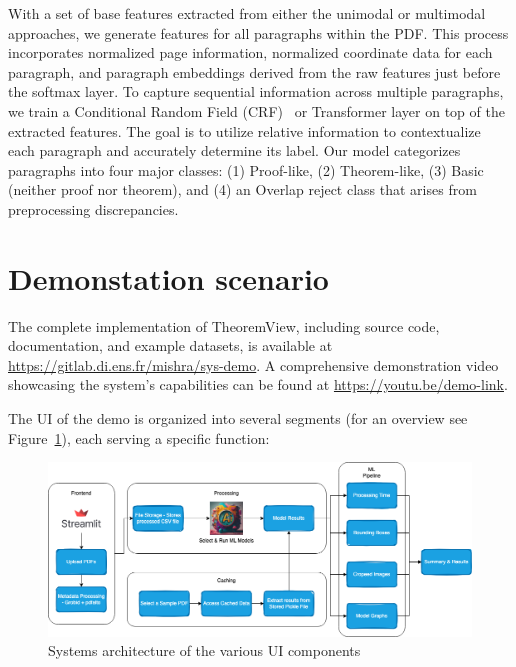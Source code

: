 \documentclass[runningheads]{llncs}
\begin{document}
With a set of base features extracted from either the unimodal or multimodal approaches, we generate 
features for all paragraphs within the PDF. This process incorporates normalized page information, 
normalized coordinate data for each paragraph, and paragraph embeddings derived from the raw features 
just before the softmax layer. To capture sequential information across multiple paragraphs, we train a 
Conditional Random Field (CRF)~\cite{crf} or Transformer layer on top of the extracted features. The goal is to utilize 
relative information to contextualize each paragraph and accurately determine its label. Our model 
categorizes paragraphs into four major classes: (1) Proof-like, (2) Theorem-like, (3) Basic (neither 
proof nor theorem), and (4) an Overlap reject class that arises from preprocessing discrepancies.

\section{Demonstation scenario}

The complete implementation of TheoremView, including source code, documentation, and example datasets, 
is available at \url{https://gitlab.di.ens.fr/mishra/sys-demo}. A comprehensive demonstration video 
showcasing the system's capabilities can be found at \url{https://youtu.be/demo-link}.

The UI of the demo is organized into several segments (for an overview see Figure~\ref{fig:system-arch}), each serving a specific function:

\begin{figure}[h]
    \centering
    \includegraphics[width=\textwidth]{images/sys-demo-arch.png}
    \caption{Systems architecture of the various UI components
    }
    \label{fig:system-arch}
\end{figure}
\end{document}
